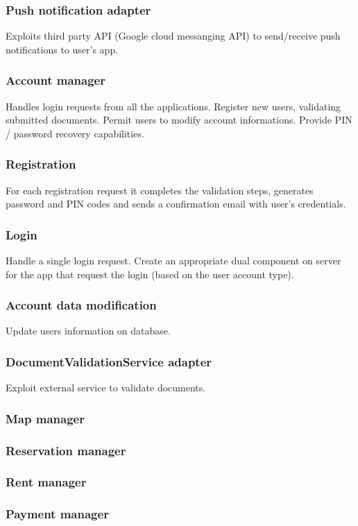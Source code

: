 \documentclass[english]{article}
\begin{document}
	\subsubsection{Push notification adapter}
	Exploits third party API (Google cloud messanging API) to send/receive push notifications to user's app.
	\subsubsection{Account manager}
	Handles login requests from all the applications. Register new users, validating  submitted documents. Permit users to modify account informations. Provide PIN / password recovery capabilities.
		\subsubsection{Registration }
		For each registration request it completes the validation steps, generates password and PIN codes and sends a confirmation email with user's credentials.
		\subsubsection{Login}
		Handle a single login request. Create an appropriate dual component on server for the app that request the login (based on the user account type).
		\subsubsection{Account data modification }
		Update users information on database.
	\subsubsection{DocumentValidationService adapter}
	Exploit external service to validate documents.
	
	\subsubsection{Map manager}
	\subsubsection{Reservation manager}
	\subsubsection{Rent manager}
	
	\subsubsection{Payment manager}
\end{document}
